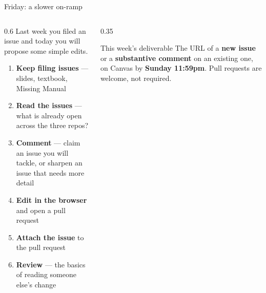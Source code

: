 \documentclass[9pt,aspectratio=169]{beamer}
\begin{document}
\begin{frame}{Friday: a slower on-ramp}
    \begin{columns}[T]
        \begin{column}{0.6\textwidth}
            Last week you filed an issue and today you will propose some simple edits.

            \medskip

            \begin{enumerate}\small
                \item[0.] \textbf{Keep filing issues} --- slides, textbook, Missing Manual
                \item \textbf{Read the issues} --- what is already open across the three repos?
                \item \textbf{Comment} --- claim an issue you will tackle, or sharpen an issue that needs more detail
                \item \textbf{Edit in the browser} and open a pull request
                \item \textbf{Attach the issue} to the pull request
                \item \textbf{Review} --- the basics of reading someone else's change
            \end{enumerate}
        \end{column}
        \begin{column}{0.35\textwidth}
            \begin{alertblock}{This week's deliverable}
                \small The URL of a \textbf{new issue} or a \textbf{substantive comment} on an existing one, on Canvas by \textbf{Sunday 11:59pm}. Pull requests are welcome, not required.
            \end{alertblock}
        \end{column}
    \end{columns}
\end{frame}
\end{document}
